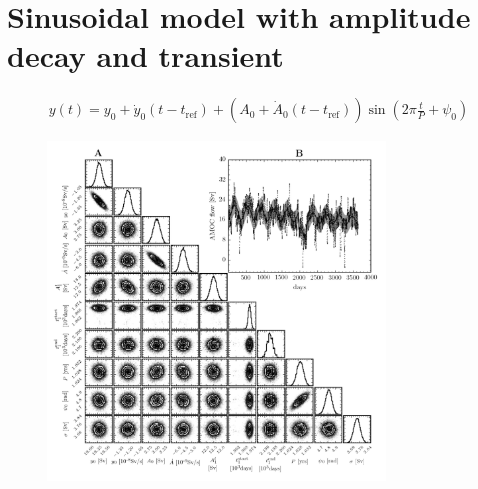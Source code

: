 \documentclass{article}
\newcommand{\tref}{t_{\textrm{ref}}}
\begin{document}
\section{Sinusoidal model with amplitude decay and transient}

\begin{align}
y(t) = y_0 + \dot{y}_0(t - \tref) + (A_0 + \dot{A}_0(t-\tref)) \sin\left(2\pi \frac{t}{P} + \psi_0\right)
\end{align}

\begin{figure}[htb]
\centering
\includegraphics[width=0.8\textwidth]{img/BasicSinusoidAmplitudeDecayWithTransient_PosteriorWithFit}
\caption{}
\label{fig:}
\end{figure}
\end{document}
